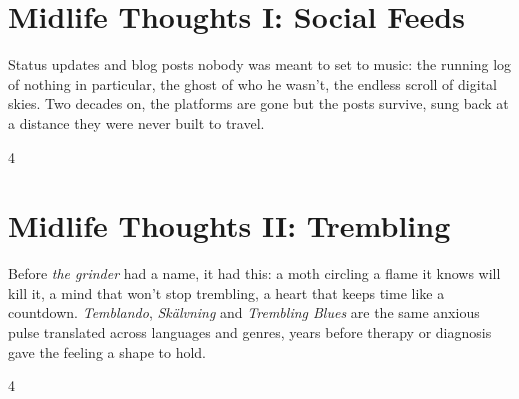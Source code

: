 \documentclass[a4paper,landscape]{memoir}
\begin{document}
\chapter{Midlife Thoughts I: Social Feeds}
Status updates and blog posts nobody was meant to set to music: the running log of nothing in particular, the ghost of who he wasn't, the endless scroll of digital skies. Two decades on, the platforms are gone but the posts survive, sung back at a distance they were never built to travel.
\clearpage\begin{multicols*}{4}










\end{multicols*}

\chapter{Midlife Thoughts II: Trembling}
Before \emph{the grinder} had a name, it had this: a moth circling a flame it knows will kill it, a mind that won't stop trembling, a heart that keeps time like a countdown. \emph{Temblando}, \emph{Skälvning} and \emph{Trembling Blues} are the same anxious pulse translated across languages and genres, years before therapy or diagnosis gave the feeling a shape to hold.
\clearpage\begin{multicols*}{4}














\end{multicols*}
\end{document}
